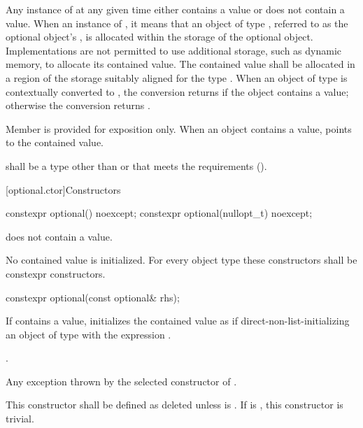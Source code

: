 \pnum
Any instance of  at any given time either contains a value or does not contain a value.
When an instance of  ,
it means that an object of type , referred to as the optional object's ,
is allocated within the storage of the optional object.
Implementations are not permitted to use additional storage, such as dynamic memory, to allocate its contained value.
The contained value shall be allocated in a region of the  storage suitably aligned for the type .
When an object of type  is contextually converted to ,
the conversion returns  if the object contains a value;
otherwise the conversion returns .

\pnum
Member  is provided for exposition only. When an  object contains a value,  points to the contained value.

\pnum
{} shall be a type
other than \cv{}  or \cv{} 
that meets the  requirements ().

[optional.ctor]{Constructors}

%
\begin{itemdecl}
constexpr optional() noexcept;
constexpr optional(nullopt_t) noexcept;
\end{itemdecl}

\begin{itemdescr}
\pnum
\ensures
{} does not contain a value.

\pnum
\remarks
No contained value is initialized.
For every object type  these constructors shall be constexpr constructors.
\end{itemdescr}

%
\begin{itemdecl}
constexpr optional(const optional& rhs);
\end{itemdecl}

\begin{itemdescr}
\pnum
\effects
If  contains a value, initializes the contained value as if
direct-non-list-initializing an object of type  with the expression .

\pnum
\ensures
{}.

\pnum
\throws
Any exception thrown by the selected constructor of .

\pnum
\remarks
This constructor shall be defined as deleted unless
 is .
If  is ,
this constructor is trivial.
\end{itemdescr}

